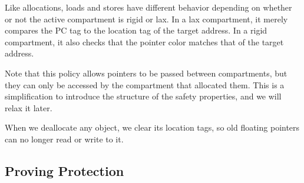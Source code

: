 \documentclass{article}
\begin{document}
Like allocations, loads and stores have different behavior depending on whether or not the active
compartment is rigid or lax. In a lax compartment, it merely compares the PC tag to the location
tag of the target address. In a rigid compartment, it also checks that the pointer color matches
that of the target address.

\hspace{-5em}
\begin{minipage}{0.55\textwidth}
\end{minipage}
\begin{minipage}{0.44\textwidth}
\end{minipage}

Note that this policy allows pointers to be passed between compartments, but they can only
be accessed by the compartment that allocated them. This is a simplification to introduce
the structure of the safety properties, and we will relax it later.

When we deallocate any object, we clear its location tags, so old floating pointers
can no longer read or write to it.

\subsection{Proving Protection}

\end{document}
